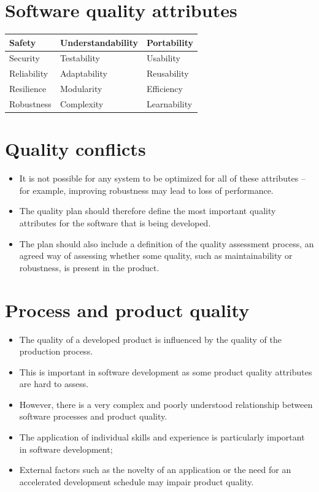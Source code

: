 \section {Software quality attributes}
\begin{table}[h!]
\centering
\begin{tabular}{ |p{3cm}|p{3cm}|p{3cm}|  }
\hline
Safety & Understandability & Portability\\
\hline
Security & Testability & Usability \\
\hline
Reliability & Adaptability & Reusability \\
\hline
Resilience & Modularity & Efficiency \\
\hline
Robustness & Complexity & Learnability\\
\hline
\end{tabular}

\label{table:T7_1}
\end{table}

\section {Quality conflicts}
\begin{itemize}

\item It is not possible for any system to be optimized for all of these attributes – for example, improving robustness may lead to loss of performance.

\item The quality plan should therefore define the most important quality attributes for the software that is being developed.

\item The plan should also include a definition of the quality assessment process, an agreed way of assessing whether some quality, such as maintainability or robustness, is present in the product.

\end{itemize} \section {Process and product quality}
\begin{itemize}

\item The quality of a developed product is influenced by the quality of the production process.

\item This is important in software development as some product quality attributes are hard to assess.

\item However, there is a very complex and poorly understood relationship between software processes and product quality.

  \item The application of individual skills and experience is particularly important in software development;
  \item External factors such as the novelty of an application or the need for an accelerated development schedule may impair product quality.
\end{itemize}
